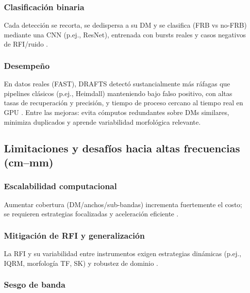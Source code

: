 \subsubsection{Clasificación binaria} 

Cada detección se recorta, se de\-dispersa a su DM y se clasifica (FRB vs no-FRB) mediante una 
CNN (p.ej., ResNet), entrenada con bursts reales y casos negativos de RFI/ruido 
\citep{Agarwal_2020,zhang2024drafts}.

\subsubsection{Desempeño} 

En datos reales (FAST), DRAFTS detectó sustancialmente más ráfagas que pipelines clásicos 
(p.ej., Heimdall) manteniendo bajo falso positivo, con altas tasas de recuperación y precisión, 
y tiempo de proceso cercano al tiempo real en GPU \citep{zhang2024drafts,Heimdall_Use}. 
Entre las mejoras: evita cómputos redundantes sobre DMs similares, minimiza duplicados y 
aprende variabilidad morfológica relevante.

\subsection{Limitaciones y desafíos hacia altas frecuencias (cm--mm)}

\subsubsection{Escalabilidad computacional} 

Aumentar cobertura (DM/anchos/sub-bandas) incrementa fuertemente el costo; se requieren estrategias 
focalizadas y aceleración eficiente \citep{zhang2024drafts,Zackay_2014_FDMT}.

\subsubsection{Mitigación de RFI y generalización} 

La RFI y su variabilidad entre instrumentos exigen estrategias dinámicas 
(p.ej., IQRM, morfología TF, SK) y robustez de dominio 
\citep{Morello_2021_IQRM,Offringa2010,Offringa2012}.

\subsubsection{Sesgo de banda}


